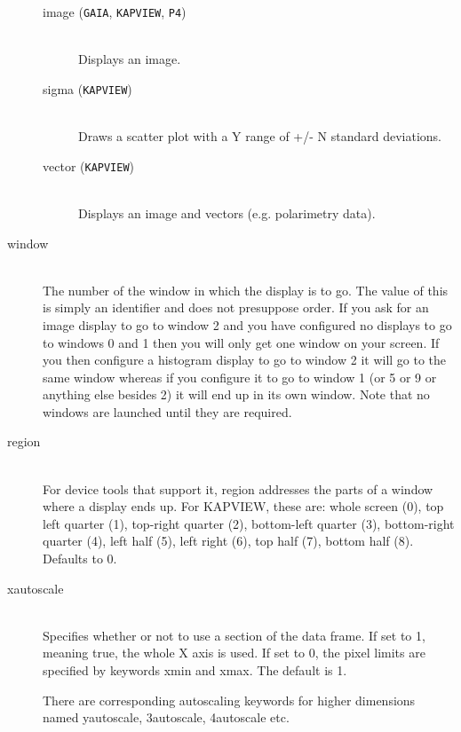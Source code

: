\documentclass[twoside,11pt]{article}
\renewcommand{\_}{\texttt{\symbol{95}}}
\begin{document}
\begin{description}
\begin{description}
\item[image ({\tt GAIA}, {\tt KAPVIEW}, {\tt P4})]%
%
\hfil\\
Displays an image.

\item[sigma ({\tt KAPVIEW})]%
%
\hfil\\
Draws a scatter plot with a Y range of +/- N standard deviations.

\item[vector ({\tt KAPVIEW})]%
%
\hfil\\
Displays an image and vectors (e.g. polarimetry data).

\end{description}

\item[window]%
%
\hfil\\
The number of the window in which the display is to go. The value of
this is simply an identifier and does not presuppose order. If you ask 
for an image display to go to window 2 and you have configured no
displays to go to windows 0 and 1 then you will only get one window on 
your screen. If you then configure a histogram display to go to window 
2 it will go to the same window whereas if you configure it to go to
window 1 (or 5 or 9 or anything else besides 2) it will end up in its
own window. Note that no windows are launched until they are
required.

\item[region]%
%
\hfil\\
For device tools that support it, region addresses the parts of a
window where a display ends up. For KAPVIEW, these are: whole screen
(0), top left quarter (1), top-right quarter (2), bottom-left quarter
(3), bottom-right quarter (4), left half (5), left right (6), top half 
(7), bottom half (8).  Defaults to 0.

\item[xautoscale]%
%
\hfil\\
Specifies whether or not to use a section of the data frame.  If set to
1, meaning true, the whole X axis is used.  If set to 0, the pixel limits
are specified by keywords xmin and xmax.  The default is 1.

There are corresponding autoscaling keywords for higher dimensions
named yautoscale, 3autoscale, 4autoscale etc.


\end{description}
\end{document}
